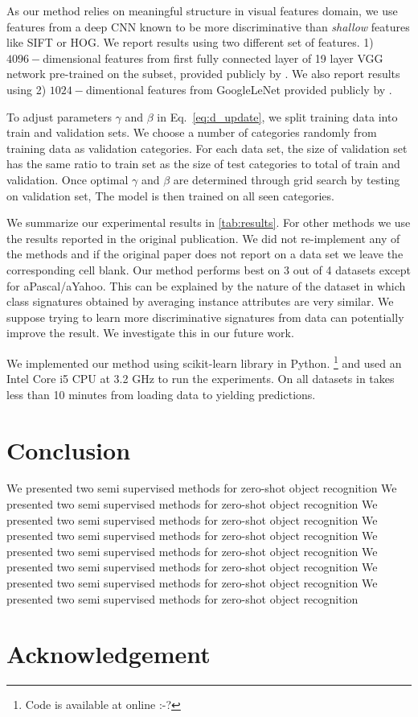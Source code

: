 \documentclass[10pt,twocolumn,letterpaper]{article}
\begin{document}
As our method relies on meaningful structure in visual features domain, we use features from a deep CNN known to
be more discriminative than \textit{shallow} features like SIFT or HOG. We report results using two different set of features.
1) $4096-$dimensional features from first fully connected layer of 19 layer VGG network \cite{vgg}
pre-trained on the subset, provided publicly by \cite{sse}. We also report results using
2) $1024-$dimentional features from GoogleLeNet \cite{googlenet} provided publicly by \cite{Akata2015}.

To adjust parameters $\gamma$ and $\beta$ in Eq.~\ref{eq:d_update}, we split training data into train and validation sets.
We choose a number of categories randomly from training data as validation categories. For each data set, the size of
validation set has the same ratio to train set as the size of test categories to total of train and validation.
Once optimal $\gamma$ and $\beta$ are determined through grid search by testing on validation set, The model
is then trained on all seen categories.

We summarize our experimental results in \ref{tab:results}. For other methods we use the results reported in the original publication.
We did not re-implement any of the methods and if the original paper does not report on a data set we leave the corresponding cell blank.
Our method performs best on 3 out of 4 datasets except for aPascal/aYahoo. This can be explained by the nature of the dataset
in which class signatures obtained by averaging instance attributes are very similar. We suppose trying to learn
more discriminative signatures from data can potentially improve the result. We investigate this in our future work.

We implemented our method using scikit-learn library \cite{} in Python.
\footnote{Code is available at online :-?}
 and used an Intel Core i5 CPU at 3.2 GHz to run the experiments.
On all datasets in takes less than 10 minutes from loading data to yielding predictions.

\section{Conclusion} \label{conclusion}
We presented two semi supervised methods for zero-shot object recognition
We presented two semi supervised methods for zero-shot object recognition
We presented two semi supervised methods for zero-shot object recognition
We presented two semi supervised methods for zero-shot object recognition
We presented two semi supervised methods for zero-shot object recognition
We presented two semi supervised methods for zero-shot object recognition
We presented two semi supervised methods for zero-shot object recognition
We presented two semi supervised methods for zero-shot object recognition

\section*{Acknowledgement}
{\small


}
\end{document}
